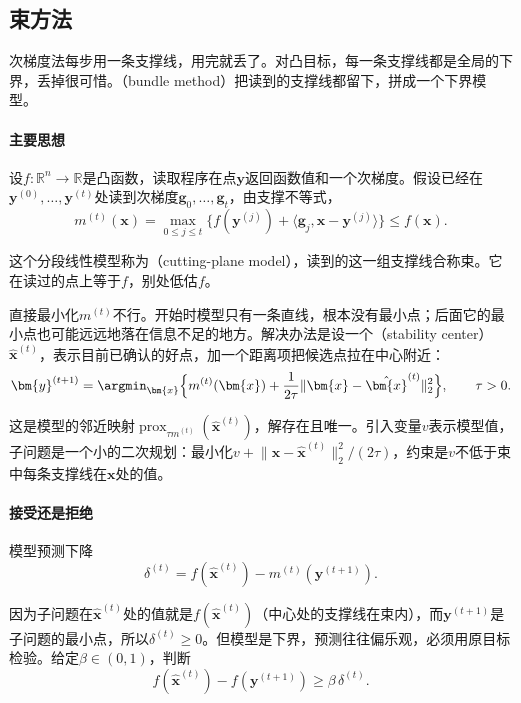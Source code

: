 \subsection{束方法}
\label{sec:ns-bundle}

次梯度法每步用一条支撑线，用完就丢了。对凸目标，每一条支撑线都是全局的下界，丢掉很可惜。（bundle method）把读到的支撑线都留下，拼成一个下界模型。

\paragraph{主要思想}
设$f:\mathbb{R}^n\to\mathbb{R}$是凸函数，读取程序在点$\bm{y}$返回函数值和一个次梯度。假设已经在$\bm{y}^{(0)},\ldots,\bm{y}^{(t)}$处读到次梯度$\bm{g}_0,\ldots,\bm{g}_t$，由支撑不等式，
\begin{equation}
 m^{(t)}(\bm{x})=\max_{0\leq j\leq t}\bigl\{f(\bm{y}^{(j)})+\langle\bm{g}_j,\bm{x}-\bm{y}^{(j)}\rangle\bigr\}\leq f(\bm{x}).
 \label{eq:ns-cutting-plane}
\end{equation}

这个分段线性模型称为（cutting-plane model），读到的这一组支撑线合称束。它在读过的点上等于$f$，别处低估$f$。

直接最小化$m^{(t)}$不行。开始时模型只有一条直线，根本没有最小点；后面它的最小点也可能远远地落在信息不足的地方。解决办法是设一个（stability center）$\hat{\bm{x}}^{(t)}$，表示目前已确认的好点，加一个距离项把候选点拉在中心附近：
\begin{equation}
 \bm{y}^{(t+1)}=\argmin_{\bm{x}}\Bigl\{m^{(t)}(\bm{x})+\frac{1}{2\tau}\lVert\bm{x}-\hat{\bm{x}}^{(t)}\rVert_2^2\Bigr\},\qquad\tau>0.
 \label{eq:ns-bundle-candidate}
\end{equation}

这是模型的邻近映射$\operatorname{prox}_{\tau m^{(t)}}(\hat{\bm{x}}^{(t)})$，解存在且唯一。引入变量$v$表示模型值，子问题是一个小的二次规划：最小化$v+\lVert\bm{x}-\hat{\bm{x}}^{(t)}\rVert_2^2/(2\tau)$，约束是$v$不低于束中每条支撑线在$\bm{x}$处的值。

\paragraph{接受还是拒绝}
模型预测下降
\begin{equation}
 \delta^{(t)}=f(\hat{\bm{x}}^{(t)})-m^{(t)}(\bm{y}^{(t+1)}).
 \label{eq:ns-predicted-decrease}
\end{equation}

因为子问题在$\hat{\bm{x}}^{(t)}$处的值就是$f(\hat{\bm{x}}^{(t)})$（中心处的支撑线在束内），而$\bm{y}^{(t+1)}$是子问题的最小点，所以$\delta^{(t)}\geq0$。但模型是下界，预测往往偏乐观，必须用原目标检验。给定$\beta\in(0,1)$，判断
\begin{equation}
 f(\hat{\bm{x}}^{(t)})-f(\bm{y}^{(t+1)})\geq\beta\,\delta^{(t)}.
 \label{eq:ns-serious-test}
\end{equation}

